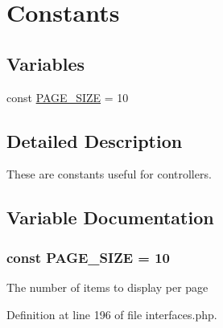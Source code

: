 \hypertarget{group__Constants}{
\section{Constants}
\label{group__Constants}
}
\subsection*{Variables}
\begin{DoxyCompactItemize}
\item 
const \hyperlink{group__Constants_ga4634a091c35db33009455321e1d259e3}{PAGE\_\-SIZE} = 10
\end{DoxyCompactItemize}


\subsection{Detailed Description}
These are constants useful for controllers. 

\subsection{Variable Documentation}
\hypertarget{group__Constants_ga4634a091c35db33009455321e1d259e3}{
\subsubsection[{PAGE\_\-SIZE}]{\setlength{\rightskip}{0pt plus 5cm}const PAGE\_\-SIZE = 10}}
\label{group__Constants_ga4634a091c35db33009455321e1d259e3}
The number of items to display per page 

Definition at line 196 of file interfaces.php.

